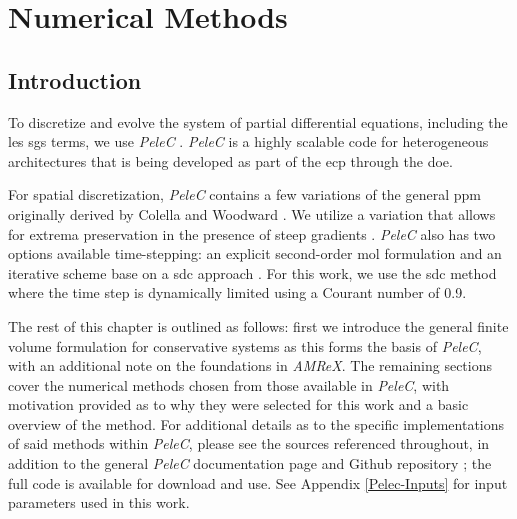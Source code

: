\chapter{Numerical Methods}
\section{Introduction}
To discretize and evolve the system of partial differential equations, including the \gls{les} \gls{sgs} terms, we use \textit{PeleC} \cite{PeleC1, PeleC2}. \textit{PeleC} is a highly scalable code for heterogeneous architectures that is being developed as part of the \gls{ecp} through the \gls{doe}. 

For spatial discretization, \textit{PeleC} contains a few variations of the general \gls{ppm} originally derived by Colella and Woodward \cite{1984JCoPPPM}. We utilize a variation that allows for extrema preservation in the presence of steep gradients \cite{MILLER200226, COLELLA20087069}. \textit{PeleC} also has two options available time-stepping: an explicit second-order \gls{mol} formulation and an iterative scheme base on a \gls{sdc} approach \cite{SDC_PeleC}. For this work, we use the \gls{sdc} method where the time step is dynamically limited using a Courant number of 0.9. 

The rest of this chapter is outlined as follows: first we introduce the general finite volume formulation for conservative systems as this forms the basis of \textit{PeleC}, with an additional note on the foundations in \textit{AMReX}. The remaining sections cover the numerical methods chosen from those available in \textit{PeleC}, with motivation provided as to why they were selected for this work and a basic overview of the method. For additional details as to the specific implementations of said methods within \textit{PeleC}, please see the sources referenced throughout, in addition to the general \textit{PeleC} documentation page \cite{PeleC_doc} and Github repository \cite{PeleC_Github}; the full code is available for download and use. See Appendix \ref{Pelec-Inputs} for input parameters used in this work.  

